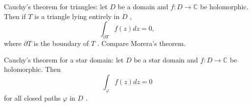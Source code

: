  Cauchy's theorem for triangles: let  $ D $  be a domain and
 $ f : D \to \mathbb{C} $  be holomorphic. Then if  $ T $  is a triangle lying
entirely in  $ D $ , 
 \[ \int_{ \partial T}f(z) dz=0, \] where  $  \partial T $  is the
boundary of  $ T $ . Compare Morera's theorem.

 \par
Cauchy's theorem for a star domain: let  $ D $  be a star domain
and  $ f : D \to \mathbb{C} $  be holomorphic. Then
 \[ \int_ \varphi f(z) dz=0 \] for all closed paths  $  \varphi  $  in
 $ D $ .